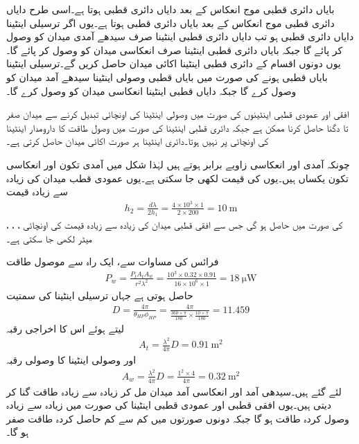 بایاں دائری قطبی موج انعکاس کے بعد دایاں دائری قطبی ہوتا ہے۔اسی طرح دایاں دائری قطبی موج انعکاس کے بعد بایاں دائری قطبی ہوتا ہے۔یوں اگر ترسیلی اینٹینا دایاں دائری قطبی ہو تب دایاں دائری قطبی اینٹینا صرف سیدھے آمدی میدان کو وصول کر پائے گا جبکہ بایاں دائری قطبی اینٹینا صرف انعکاسی میدان کو وصول کر پائے گا۔یوں دونوں اقسام کے دائری قطبی اینٹینا اکائی میدان حاصل کریں گے۔ترسیلی اینٹینا بایاں قطبی ہونے کی صورت میں بایاں قطبی وصولی اینٹینا سیدھے آمد میدان کو وصول کرے گا جبکہ دایاں قطبی اینٹینا انعکاسی میدان کو وصول کرے گا۔

افقی اور عمودی قطبی اینٹینوں کی صورت میں وصولی اینٹینا کی اونچائی تبدیل کرنے سے میدان صفر تا دگنا حاصل کرنا ممکن ہے جبکہ دائری قطبی اینٹینا کی صورت میں وصول طاقت کا دارومدار اینٹینا کی اونچائی پر نہیں ہوتا۔دائری اینٹینا ہر صورت اکائی میدان حاصل کرتی ہے۔ 

چونکہ آمدی اور انعکاسی زاویے برابر ہوتے ہیں لہٰذا شکل میں آمدی تکون اور انعکاسی تکون یکساں ہیں۔یوں  کی قیمت  لکھی جا سکتی ہے۔یوں عمودی قطب میدان کی زیادہ سے زیادہ قیمت
\begin{align*}
h_2=\frac{d \lambda}{2 h_1}=\frac{4\times 10^3 \times 1}{2 \times 200}=\SI{10}{\meter}
\end{align*}
کی صورت میں حاصل ہو گی جس سے افقی قطبی میدان کی زیادہ سے زیادہ قیمت کی اونچائی ، ، ،  میٹر لکھی جا سکتی ہے۔

فرائس کی مساوات سے، ایک راہ سے موصول طاقت
\begin{align*}
P_w=\frac{P_t A_t A_w}{r^2 \lambda^2}=\frac{10^3\times0.32\times0.91}{16\times 10^6 \times 1}=\SI{18}{\micro \watt}
\end{align*}
حاصل ہوتی ہے جہاں ترسیلی اینٹینا کی سمتیت
\begin{align*}
D=\frac{4\pi}{\theta_{HP} \phi_{HP}}=\frac{4\pi}{\frac{360 \times \pi}{180} \times \frac{10 \times \pi}{180}}= 11.459
\end{align*}
لیتے ہوئے اس کا اخراجی رقبہ 
\begin{align*}
A_t=\frac{\lambda^2}{4\pi} D=\SI{0.91}{\meter \squared}
\end{align*}
اور وصولی اینٹینا کا وصولی رقبہ
\begin{align*}
A_w=\frac{\lambda^2}{4\pi}D=\frac{1^2 \times 4}{4\pi}=\SI{0.32}{\meter\squared}
\end{align*}
لئے گئے ہیں۔سیدھی آمد اور انعکاسی آمد میدان مل کر زیادہ سے زیادہ طاقت  گنا کر دیتی ہیں۔یوں افقی قطبی اور عمودی قطبی اینٹینا کی صورت میں زیادہ سے زیادہ وصول کردہ طاقت  ہو گا جبکہ دونوں صورتوں میں کم سے کم حاصل کردہ طاقت صفر ہو گا۔ 
 

